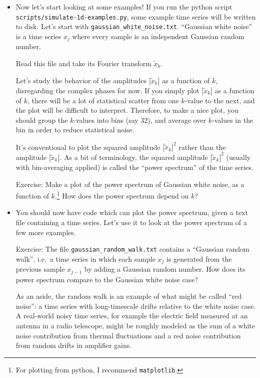 \documentclass[aps,prd,superscriptaddress,groupedaddress,nofootinbib,nobibnotes]{revtex4}
\def\tx{{\tilde x}}
\begin{document}
\begin{itemize}
\item Now let's start looking at some examples!
  If you run the python script {\tt scripts/simulate-1d-examples.py}, some example time series will be written to disk.
  Let's start with {\tt gaussian\_white\_noise.txt}.
  ``Gaussian white noise'' is a time series $x_j$ where every sample is an independent Gaussian random number.

  Read this file and take its Fourier transform $\tx_k$.

  Let's study the behavior of the amplitudes $|\tx_k|$ as a function of $k$,
  disregarding the complex phases for now.
  If you simply plot $|\tx_k|$ as a function of $k$, there will be a lot of statistical scatter
  from one $k$-value to the next, and the plot will be difficult to interpret.
  Therefore, to make a nice plot, you should group the $k$-values into bins (say 32), and average 
  over $k$-values in the bin in order to reduce statistical noise.

  It's conventional to plot the squared amplitude $|\tx_k|^2$ rather than the amplitude $|\tx_k|$.
  As a bit of terminology, the squared amplitude $|\tx_k|^2$ (usually with bin-averaging applied)
  is called the ``power spectrum'' of the time series.
 
  Exercise: Make a plot of the power spectrum of Gaussian white noise, 
  as a function of $k$.\footnote{For plotting from python, I recommend {\tt matplotlib}.}
  How does the power spectrum depend on $k$?

\item You should now have code which can plot the power spectrum, given a text file containing
 a time series.  Let's use it to look at the power spectrum of a few more examples.

 Exercise: The file {\tt gaussian\_random\_walk.txt} contains a ``Gaussian random walk'', i.e.~a time
 series in which each sample $x_j$ is generated from the previous sample $x_{j-1}$ by adding
 a Gaussian random number.  How does its power spectrum compare to the Gaussian white noise case?

 As an aside, the random walk is an example of what might be called ``red noise'': a time series
 with long-timescale drifts relative to the white noise case.  A real-world noisy time series, for
 example the electric field measured at an antenna in a radio telescope, might be roughly modeled
 as the sum of a white noise contribution from thermal fluctuations and a red noise contribution
 from random drifts in amplifier gains.


\end{itemize}
\end{document}
